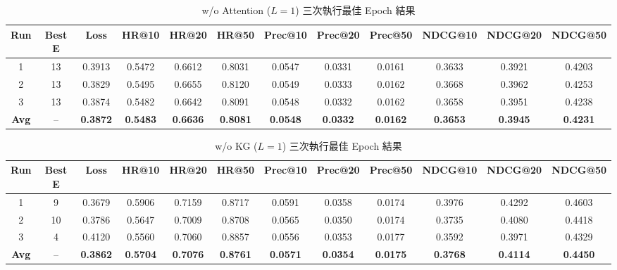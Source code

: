 \begin{table}[H]
  \centering
  \footnotesize
  \setlength{\tabcolsep}{3pt}
  \caption{w/o Attention ($L{=}1$) 三次執行最佳 Epoch 結果}
  \label{tab:wo_attn_runs}
  \begin{tabular}{c c c ccc ccc ccc}
    \toprule
    Run & Best E & Loss & HR@10 & HR@20 & HR@50 & Prec@10 & Prec@20 & Prec@50 & NDCG@10 & NDCG@20 & NDCG@50 \\
    \midrule
    1 & 13 & 0.3913 & 0.5472 & 0.6612 & 0.8031 & 0.0547 & 0.0331 & 0.0161 & 0.3633 & 0.3921 & 0.4203 \\
    2 & 13 & 0.3829 & 0.5495 & 0.6655 & 0.8120 & 0.0549 & 0.0333 & 0.0162 & 0.3668 & 0.3962 & 0.4253 \\
    3 & 13 & 0.3874 & 0.5482 & 0.6642 & 0.8091 & 0.0548 & 0.0332 & 0.0162 & 0.3658 & 0.3951 & 0.4238 \\
    \midrule
    \textbf{Avg} & -- & \textbf{0.3872} & \textbf{0.5483} & \textbf{0.6636} & \textbf{0.8081} & \textbf{0.0548} & \textbf{0.0332} & \textbf{0.0162} & \textbf{0.3653} & \textbf{0.3945} & \textbf{0.4231} \\
    \bottomrule
  \end{tabular}
\end{table}

\begin{table}[H]
  \centering
  \footnotesize
  \setlength{\tabcolsep}{3pt}
  \caption{w/o KG ($L{=}1$) 三次執行最佳 Epoch 結果}
  \label{tab:wo_kg_runs}
  \begin{tabular}{c c c ccc ccc ccc}
    \toprule
    Run & Best E & Loss & HR@10 & HR@20 & HR@50 & Prec@10 & Prec@20 & Prec@50 & NDCG@10 & NDCG@20 & NDCG@50 \\
    \midrule
    1 & 9 & 0.3679 & 0.5906 & 0.7159 & 0.8717 & 0.0591 & 0.0358 & 0.0174 & 0.3976 & 0.4292 & 0.4603 \\
    2 & 10 & 0.3786 & 0.5647 & 0.7009 & 0.8708 & 0.0565 & 0.0350 & 0.0174 & 0.3735 & 0.4080 & 0.4418 \\
    3 & 4 & 0.4120 & 0.5560 & 0.7060 & 0.8857 & 0.0556 & 0.0353 & 0.0177 & 0.3592 & 0.3971 & 0.4329 \\
    \midrule
    \textbf{Avg} & -- & \textbf{0.3862} & \textbf{0.5704} & \textbf{0.7076} & \textbf{0.8761} & \textbf{0.0571} & \textbf{0.0354} & \textbf{0.0175} & \textbf{0.3768} & \textbf{0.4114} & \textbf{0.4450} \\
    \bottomrule
  \end{tabular}
\end{table}

